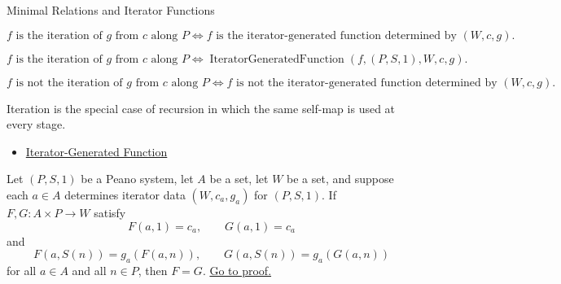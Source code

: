 \begin{topicbox}{Minimal Relations and Iterator Functions}
\begin{remark*}
\[
f \text{ is the iteration of } g \text{ from } c \text{ along } P
\Longleftrightarrow
f \text{ is the iterator-generated function determined by } (W,c,g).
\]
\end{remark*}

\begin{remark*}
\[
f \text{ is the iteration of } g \text{ from } c \text{ along } P
\Longleftrightarrow
\operatorname{IteratorGeneratedFunction}(f,(P,S,1),W,c,g).
\]
\end{remark*}

\begin{remark*}
\[
f \text{ is not the iteration of } g \text{ from } c \text{ along } P
\Longleftrightarrow
f \text{ is not the iterator-generated function determined by } (W,c,g).
\]
\end{remark*}

\begin{remark*}[Interpretation]
Iteration is the special case of recursion in which the same self-map is used
at every stage.
\end{remark*}

\begin{dependencies}
\begin{itemize}
  \item \hyperref[def:iterator-generated-function]{Iterator-Generated Function}
\end{itemize}
\end{dependencies}

\begin{tcolorbox}[colback=corbox, colframe=corborder, arc=2pt,
  left=6pt, right=6pt, top=4pt, bottom=4pt,
  title={\small\textbf{Corollary (Uniqueness of Binary Iterator Operations)}},
  fonttitle=\small\bfseries]
\begin{corollary}
\label{cor:uniqueness-of-binary-iterator-operations}
Let $(P,S,1)$ be a Peano system, let $A$ be a set, let $W$ be a set, and
suppose each $a\in A$ determines iterator data $(W,c_a,g_a)$ for $(P,S,1)$.
If $F,G:A\times P\to W$ satisfy
\[
F(a,1)=c_a,\qquad G(a,1)=c_a
\]
and
\[
F(a,S(n))=g_a(F(a,n)),
\qquad
G(a,S(n))=g_a(G(a,n))
\]
for all $a\in A$ and all $n\in P$, then $F=G$.
\hyperref[prf:uniqueness-of-binary-iterator-operations]{Go to proof.}
\end{corollary}
\end{tcolorbox}


\end{topicbox}
